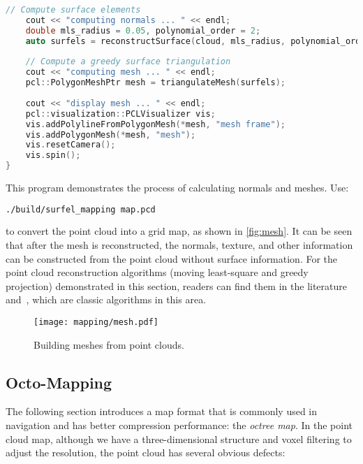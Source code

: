 \begin{lstlisting}[language=c++,caption=slambook2/ch12/dense_RGBD/surfel_mapping.cpp]
	// Compute surface elements
	cout << "computing normals ... " << endl;
	double mls_radius = 0.05, polynomial_order = 2;
	auto surfels = reconstructSurface(cloud, mls_radius, polynomial_order);
	
	// Compute a greedy surface triangulation
	cout << "computing mesh ... " << endl;
	pcl::PolygonMeshPtr mesh = triangulateMesh(surfels);
	
	cout << "display mesh ... " << endl;
	pcl::visualization::PCLVisualizer vis;
	vis.addPolylineFromPolygonMesh(*mesh, "mesh frame");
	vis.addPolygonMesh(*mesh, "mesh");
	vis.resetCamera();
	vis.spin();
}
\end{lstlisting}

This program demonstrates the process of calculating normals and meshes. Use:
\begin{lstlisting}[language=sh,caption=Terminal input:]
./build/surfel_mapping map.pcd
\end{lstlisting}
to convert the point cloud into a grid map, as shown in \autoref{fig:mesh}. It can be seen that after the mesh is reconstructed, the normals, texture, and other information can be constructed from the point cloud without surface information. For the point cloud reconstruction algorithms (moving least-square and greedy projection) demonstrated in this section, readers can find them in the literature~\cite{Alexa2003} and~\cite{Marton2009}, which are classic algorithms in this area.

\begin{figure}[!htp]
	\centering
	\texttt{[image: mapping/mesh.pdf]}
	\caption{Building meshes from point clouds.}
	\label{fig:mesh}
\end{figure}

\subsection{Octo-Mapping}
The following section introduces a map format that is commonly used in navigation and has better compression performance: the \textit{octree map}. In the point cloud map, although we have a three-dimensional structure and voxel filtering to adjust the resolution, the point cloud has several obvious defects:

